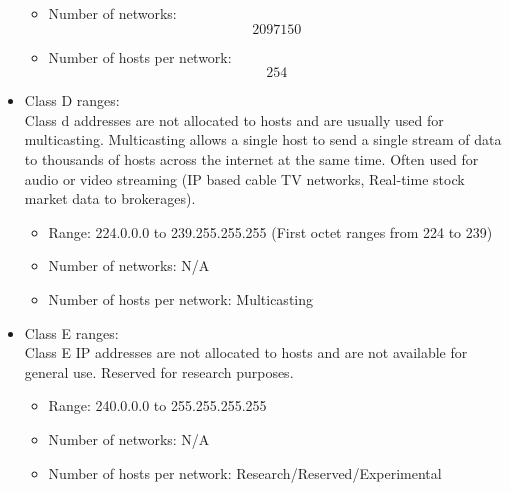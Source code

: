\begin{itemize}
\begin{itemize}
        \item Number of networks: \[2097150\]
        \item Number of hosts per network: \[254\]
    \end{itemize}
    \item Class D ranges:\\
    Class d addresses are not allocated to hosts and are usually used for multicasting. Multicasting allows a single host to send a single stream of data to thousands of hosts across the internet at the same time. Often used for audio or video streaming (IP based cable TV networks, Real-time stock market data to brokerages).
    \begin{itemize}
        \item Range: 224.0.0.0 to 239.255.255.255 (First octet ranges from 224 to 239)
        \item Number of networks: N/A
        \item Number of hosts per network: Multicasting
    \end{itemize}
    \item Class E ranges:\\
    Class E IP addresses are not allocated to hosts and are not available for general use. Reserved for research purposes.
    \begin{itemize}
        \item Range: 240.0.0.0 to 255.255.255.255
        \item Number of networks: N/A
        \item Number of hosts per network: Research/Reserved/Experimental
    \end{itemize}
\end{itemize}